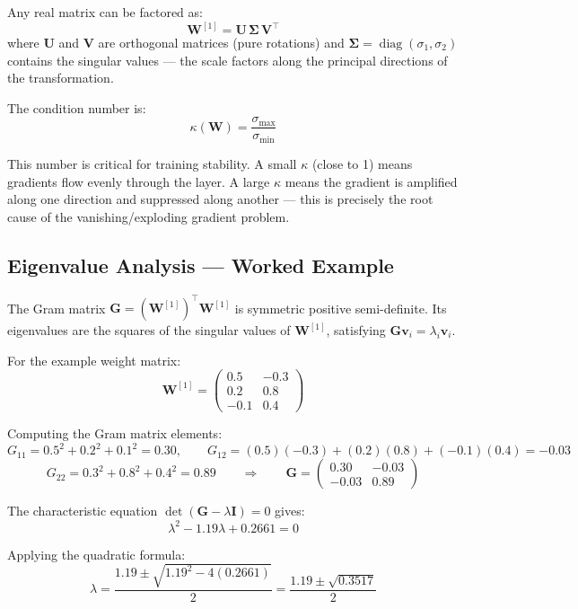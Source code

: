 \documentclass[12pt,a4paper]{article}
\begin{document}
Any real matrix can be factored as:
\begin{equation}
  \mathbf{W}^{[1]} = \mathbf{U}\,\boldsymbol{\Sigma}\,\mathbf{V}^\top
  \label{eq:svd}
\end{equation}
where $\mathbf{U}$ and $\mathbf{V}$ are orthogonal matrices (pure rotations) and $\boldsymbol{\Sigma} = \operatorname{diag}(\sigma_1, \sigma_2)$ contains the singular values --- the scale factors along the principal directions of the transformation.

The condition number is:
\begin{equation}
  \kappa(\mathbf{W}) = \frac{\sigma_{\max}}{\sigma_{\min}}
  \label{eq:cond}
\end{equation}

This number is critical for training stability. A small $\kappa$ (close to 1) means gradients flow evenly through the layer. A large $\kappa$ means the gradient is amplified along one direction and suppressed along another --- this is precisely the root cause of the vanishing/exploding gradient problem.

\subsection{Eigenvalue Analysis --- Worked Example}

The Gram matrix $\mathbf{G} = (\mathbf{W}^{[1]})^\top\mathbf{W}^{[1]}$ is symmetric positive semi-definite. Its eigenvalues are the squares of the singular values of $\mathbf{W}^{[1]}$, satisfying $\mathbf{G}\mathbf{v}_i = \lambda_i\mathbf{v}_i$.

For the example weight matrix:
\[
  \mathbf{W}^{[1]} = \begin{pmatrix}0.5&-0.3\\0.2&0.8\\-0.1&0.4\end{pmatrix}
\]

Computing the Gram matrix elements:
\[
  G_{11} = 0.5^2+0.2^2+0.1^2 = 0.30, \qquad
  G_{12} = (0.5)(-0.3)+(0.2)(0.8)+(-0.1)(0.4) = -0.03
\]
\[
  G_{22} = 0.3^2+0.8^2+0.4^2 = 0.89
  \qquad\Rightarrow\qquad
  \mathbf{G} = \begin{pmatrix}0.30&-0.03\\-0.03&0.89\end{pmatrix}
\]

The characteristic equation $\det(\mathbf{G} - \lambda\mathbf{I}) = 0$ gives:
\[
  \lambda^2 - 1.19\lambda + 0.2661 = 0
\]

Applying the quadratic formula:
\[
  \lambda = \frac{1.19 \pm \sqrt{1.19^2 - 4(0.2661)}}{2} = \frac{1.19 \pm \sqrt{0.3517}}{2}
\]
\end{document}
